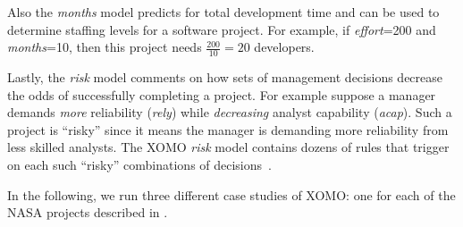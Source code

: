 Also the {\em months} model predicts for total development time and   can be used to determine staffing levels
for a software project. For example, if {\em effort}=200  
and {\em months}=10, then this project needs 
$\frac{200}{10} =20$
developers.

Lastly, the  {\em risk} model comments on how sets of management decisions decrease the 
odds of successfully completing a project. For example suppose a manager demands
{\em more}  reliability ({\em rely}) while  {\em decreasing} analyst capability ({\em acap}).
Such a project is ``risky'' since it means the manager is demanding more reliability from less skilled analysts.
The XOMO {\em risk} model contains dozens of rules that trigger on each
such ``risky'' combinations of decisions~\cite{madachy97}. 

In the following, we run three different case studies
of  XOMO: one for each of the NASA projects described in .
